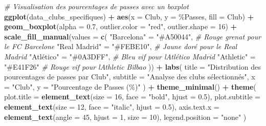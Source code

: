 \documentclass[
]{article}
\newenvironment{Shaded}{\begin{snugshade}}{\end{snugshade}}
\newcommand{\AttributeTok}[1]{\textcolor[rgb]{0.13,0.29,0.53}{#1}}
\newcommand{\CommentTok}[1]{\textcolor[rgb]{0.56,0.35,0.01}{\textit{#1}}}
\newcommand{\DecValTok}[1]{\textcolor[rgb]{0.00,0.00,0.81}{#1}}
\newcommand{\FloatTok}[1]{\textcolor[rgb]{0.00,0.00,0.81}{#1}}
\newcommand{\FunctionTok}[1]{\textcolor[rgb]{0.13,0.29,0.53}{\textbf{#1}}}
\newcommand{\NormalTok}[1]{#1}
\newcommand{\OtherTok}[1]{\textcolor[rgb]{0.56,0.35,0.01}{#1}}
\newcommand{\SpecialCharTok}[1]{\textcolor[rgb]{0.81,0.36,0.00}{\textbf{#1}}}
\newcommand{\StringTok}[1]{\textcolor[rgb]{0.31,0.60,0.02}{#1}}
\begin{document}
\begin{Shaded}
\begin{Highlighting}[]
\CommentTok{\# Visualisation des pourcentages de passes avec un boxplot}
\FunctionTok{ggplot}\NormalTok{(data\_clubs\_specifiques) }\SpecialCharTok{+}
  \FunctionTok{aes}\NormalTok{(}\AttributeTok{x =}\NormalTok{ Club, }\AttributeTok{y =} \StringTok{\textasciigrave{}}\AttributeTok{\%Passes}\StringTok{\textasciigrave{}}\NormalTok{, }\AttributeTok{fill =}\NormalTok{ Club) }\SpecialCharTok{+}
  \FunctionTok{geom\_boxplot}\NormalTok{(}\AttributeTok{alpha =} \FloatTok{0.7}\NormalTok{, }\AttributeTok{outlier.color =} \StringTok{"red"}\NormalTok{, }\AttributeTok{outlier.shape =} \DecValTok{16}\NormalTok{) }\SpecialCharTok{+}
  \FunctionTok{scale\_fill\_manual}\NormalTok{(}\AttributeTok{values =} \FunctionTok{c}\NormalTok{(}
    \StringTok{"Barcelona"} \OtherTok{=} \StringTok{"\#A50044"}\NormalTok{,        }\CommentTok{\# Rouge grenat pour le FC Barcelone}
    \StringTok{"Real Madrid"} \OtherTok{=} \StringTok{"\#FEBE10"}\NormalTok{,      }\CommentTok{\# Jaune doré pour le Real Madrid}
    \StringTok{"Atlético"} \OtherTok{=} \StringTok{"\#0A3DFF"}\NormalTok{,         }\CommentTok{\# Bleu vif pour l\textquotesingle{}Atlético Madrid}
    \StringTok{"Athletic"} \OtherTok{=} \StringTok{"\#E41F26"}   \CommentTok{\# Rouge vif pour l\textquotesingle{}Athletic Bilbao}
\NormalTok{  )) }\SpecialCharTok{+}
  \FunctionTok{labs}\NormalTok{(}
    \AttributeTok{title =} \StringTok{"Distribution des pourcentages de passes par Club"}\NormalTok{,}
    \AttributeTok{subtitle =} \StringTok{"Analyse des clubs sélectionnés"}\NormalTok{,}
    \AttributeTok{x =} \StringTok{"Club"}\NormalTok{,}
    \AttributeTok{y =} \StringTok{"Pourcentage de Passes (\%)"}
\NormalTok{  ) }\SpecialCharTok{+}
  \FunctionTok{theme\_minimal}\NormalTok{() }\SpecialCharTok{+}
  \FunctionTok{theme}\NormalTok{(}
    \AttributeTok{plot.title =} \FunctionTok{element\_text}\NormalTok{(}\AttributeTok{size =} \DecValTok{16}\NormalTok{, }\AttributeTok{face =} \StringTok{"bold"}\NormalTok{, }\AttributeTok{hjust =} \FloatTok{0.5}\NormalTok{),}
    \AttributeTok{plot.subtitle =} \FunctionTok{element\_text}\NormalTok{(}\AttributeTok{size =} \DecValTok{12}\NormalTok{, }\AttributeTok{face =} \StringTok{"italic"}\NormalTok{, }\AttributeTok{hjust =} \FloatTok{0.5}\NormalTok{),}
    \AttributeTok{axis.text.x =} \FunctionTok{element\_text}\NormalTok{(}\AttributeTok{angle =} \DecValTok{45}\NormalTok{, }\AttributeTok{hjust =} \DecValTok{1}\NormalTok{, }\AttributeTok{size =} \DecValTok{10}\NormalTok{),}
    \AttributeTok{legend.position =} \StringTok{"none"}
\NormalTok{  )}
\end{Highlighting}
\end{Shaded}
\end{document}
